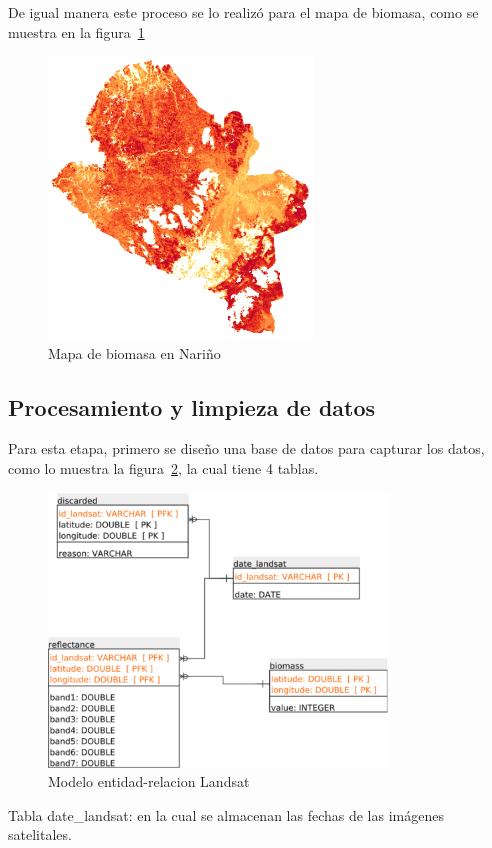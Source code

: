 De igual manera este proceso se lo realizó para el mapa de biomasa, como se muestra en la figura~\ref{fig:mapaNarino}

\begin{figure}
  \centering
  \includegraphics[width = 7cm]{mapaNarino.png}
  \caption{Mapa de biomasa en Nariño \cite{baccini2012estimated}}
  \label{fig:mapaNarino}
\end{figure}

\subsection{Procesamiento y limpieza de datos}

Para esta etapa, primero se diseño una base de datos para capturar los datos,
como lo muestra la figura~\ref{fig:landsatET}, la cual tiene 4 tablas. 

\begin{figure}
  \centering
  \includegraphics[width = 9cm]{landsatET.pdf}
  \caption{Modelo entidad-relacion Landsat}
  \label{fig:landsatET}
\end{figure}

Tabla date\_landsat: en la cual se almacenan las fechas de las imágenes satelitales.

